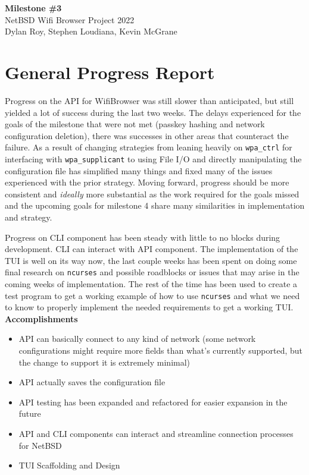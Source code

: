 \documentclass[11pt]{article}
\begin{document}
\begin{center}
  \textbf{\Large Milestone \#3}\\\large NetBSD Wifi Browser Project 2022\\
  Dylan Roy, Stephen Loudiana, Kevin McGrane
\end{center}


\section{General Progress Report}
Progress on the API for WifiBrowser was still slower than anticipated, but still yielded a lot of success
during the last two weeks. The delays experienced for the goals of the milestone that were not met
(passkey hashing and network configuration deletion), there was successes in other areas that counteract
the failure. As a result of changing strategies from leaning heavily on \texttt{wpa\_ctrl} for interfacing
with \texttt{wpa\_supplicant} to using File I/O and directly manipulating the configuration file has
simplified many things and fixed many of the issues experienced with the prior strategy. Moving forward,
progress should be more consistent and \textit{ideally} more substantial as the work required for the goals
missed and the upcoming goals for milestone 4 share many similarities in implementation and strategy.

Progress on CLI component has been steady with little to no blocks during development. CLI can interact 
with API component. 
The implementation of the TUI is well on its way now, the last couple weeks has been 
spent on doing some final research on \texttt{ncurses} and possible roadblocks or issues that may arise in the coming
weeks of implementation. The rest of the time has been used to create a test program to get a working example
of how to use \texttt{ncurses} and what we need to know to properly implement the needed requirements to get a 
working TUI.\\

\textbf{Accomplishments}
\begin{itemize}
  \item API can basically connect to any kind of network (some network configurations might require more
    fields than what's currently supported, but the change to support it is extremely minimal)
  \item API actually saves the configuration file
  \item API testing has been expanded and refactored for easier expansion in the future
  \item API and CLI components can interact and streamline connection processes for NetBSD
  \item TUI Scaffolding and Design
\end{itemize}
\end{document}
